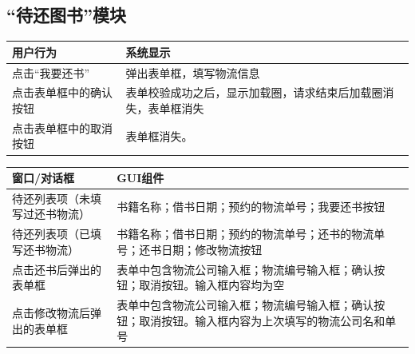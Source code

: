 \subsection{“待还图书”模块}
\begin{table}[ht]
    \centering
    \begin{tabular*}{\textwidth}{p{}p{}}
        \hline
        用户行为 & 系统显示\\
        \hline
        点击“我要还书” & 弹出表单框，填写物流信息\\
        点击表单框中的确认按钮 & 表单校验成功之后，显示加载圈，请求结束后加载圈消失，表单框消失\\
        点击表单框中的取消按钮 & 表单框消失。\\
        \hline
    \end{tabular*}
    \begin{tabular*}{\textwidth}{p{}p{}}
        \hline
        窗口/对话框  & GUI组件 \\
        \hline
        待还列表项（未填写过还书物流） & 书籍名称；借书日期；预约的物流单号；我要还书按钮\\
        待还列表项（已填写还书物流） & 书籍名称；借书日期；预约的物流单号；还书的物流单号；还书日期；修改物流按钮\\
        点击还书后弹出的表单框 & 表单中包含物流公司输入框；物流编号输入框；确认按钮；取消按钮。输入框内容均为空 \\
        点击修改物流后弹出的表单框 & 表单中包含物流公司输入框；物流编号输入框；确认按钮；取消按钮。输入框内容为上次填写的物流公司名和单号\\
        \hline
    \end{tabular*}
\end{table}








